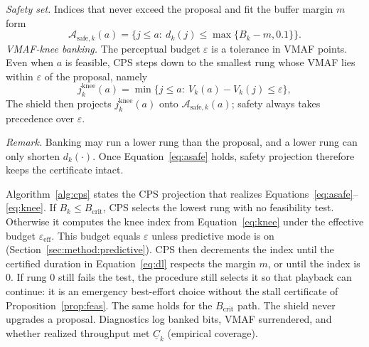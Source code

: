 \emph{Safety set.} Indices that never exceed the proposal and fit the buffer margin \(m\) form
\begin{equation}
\label{eq:asafe}
    \mathcal{A}_{\mathrm{safe},k}(a)=\bigl\{j\le a:\ d_k(j)\le \max\{B_k-m,0.1\}\bigr\}.
\end{equation}
\emph{VMAF-knee banking.} The perceptual budget \(\varepsilon\) is a tolerance in VMAF points. Even when \(a\) is feasible, CPS steps down to the smallest rung whose VMAF lies within \(\varepsilon\) of the proposal, namely
\begin{equation}
\label{eq:knee}
    j^{\mathrm{knee}}_k(a)=\min\bigl\{j\le a:\ V_k(a)-V_k(j)\le\varepsilon\bigr\},
\end{equation}
The shield then projects \(j^{\mathrm{knee}}_k(a)\) onto \(\mathcal{A}_{\mathrm{safe},k}(a)\); safety always takes precedence over \(\varepsilon\).

\emph{Remark.}
Banking may run a lower rung than the proposal, and a lower rung can only shorten \(d_k(\cdot)\).
Once Equation~\eqref{eq:asafe} holds, safety projection therefore keeps the certificate intact.

Algorithm~\ref{alg:cps} states the CPS projection that realizes Equations~\eqref{eq:asafe}--\eqref{eq:knee}.
If \(B_k\le B_{\mathrm{crit}}\), CPS selects the lowest rung with no feasibility test.
Otherwise it computes the knee index from Equation~\eqref{eq:knee} under the effective budget \(\varepsilon_{\mathrm{eff}}\).
This budget equals \(\varepsilon\) unless predictive mode is on (Section~\ref{sec:method:predictive}).
CPS then decrements the index until the certified duration in Equation~\eqref{eq:dl} respects the margin \(m\), or until the index is \(0\).
If rung \(0\) still fails the test, the procedure still selects it so that playback can continue: it is an emergency best-effort choice without the stall certificate of Proposition~\ref{prop:feas}.
The same holds for the \(B_{\mathrm{crit}}\) path.
The shield never upgrades a proposal.
Diagnostics log banked bits, VMAF surrendered, and whether realized throughput met \(\underline{C}_k\) (empirical coverage).

